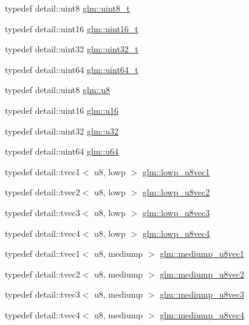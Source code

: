 \begin{CompactItemize}
\item 
typedef detail::uint8 \hyperlink{group__gtc__type__precision_g93adf6dd9803408f3e3aaf9dedda352b}{glm::uint8\_\-t}
\item 
typedef detail::uint16 \hyperlink{group__gtc__type__precision_gc4eb4f43cae8129b00086dc234d3b8fc}{glm::uint16\_\-t}
\item 
typedef detail::uint32 \hyperlink{group__gtc__type__precision_g822ca53a9ad412504532838906276a99}{glm::uint32\_\-t}
\item 
typedef detail::uint64 \hyperlink{group__gtc__type__precision_g058f57c19e1befdcf12498944bd73e69}{glm::uint64\_\-t}
\item 
typedef detail::uint8 \hyperlink{group__gtc__type__precision_g5e3dc67373d5068997d2d9f41c9024d2}{glm::u8}
\item 
typedef detail::uint16 \hyperlink{group__gtc__type__precision_ge7a1571503f83d2264ddfa705a6b082a}{glm::u16}
\item 
typedef detail::uint32 \hyperlink{group__gtc__type__precision_g54e837745059fd29017bed71cfa0a8db}{glm::u32}
\item 
typedef detail::uint64 \hyperlink{group__gtc__type__precision_g71cedd4972f9cb1a5e14dfe5ab83ecd7}{glm::u64}
\item 
typedef detail::tvec1$<$ u8, lowp $>$ \hyperlink{group__gtc__type__precision_gee3cba2c93fa8cb7295671908995197c}{glm::lowp\_\-u8vec1}
\item 
typedef detail::tvec2$<$ u8, lowp $>$ \hyperlink{group__gtc__type__precision_g8e5a056cbbcb70dca5c65950fa13a787}{glm::lowp\_\-u8vec2}
\item 
typedef detail::tvec3$<$ u8, lowp $>$ \hyperlink{group__gtc__type__precision_gf0d7154052c636edf4a902fc8a4a56f2}{glm::lowp\_\-u8vec3}
\item 
typedef detail::tvec4$<$ u8, lowp $>$ \hyperlink{group__gtc__type__precision_g98f82380862128fac9afae1b53840562}{glm::lowp\_\-u8vec4}
\item 
typedef detail::tvec1$<$ u8, mediump $>$ \hyperlink{group__gtc__type__precision_gdefca284b7a5980fb6be735abb77395e}{glm::mediump\_\-u8vec1}
\item 
typedef detail::tvec2$<$ u8, mediump $>$ \hyperlink{group__gtc__type__precision_g5e20c1315bc1fecc867bc74525bea2ab}{glm::mediump\_\-u8vec2}
\item 
typedef detail::tvec3$<$ u8, mediump $>$ \hyperlink{group__gtc__type__precision_g58f79eee840b2838443292c50ddb2919}{glm::mediump\_\-u8vec3}
\item 
typedef detail::tvec4$<$ u8, mediump $>$ \hyperlink{group__gtc__type__precision_g407b5aa9a3fd6d344b70fa6ce2ce92d4}{glm::mediump\_\-u8vec4}

\end{CompactItemize}

